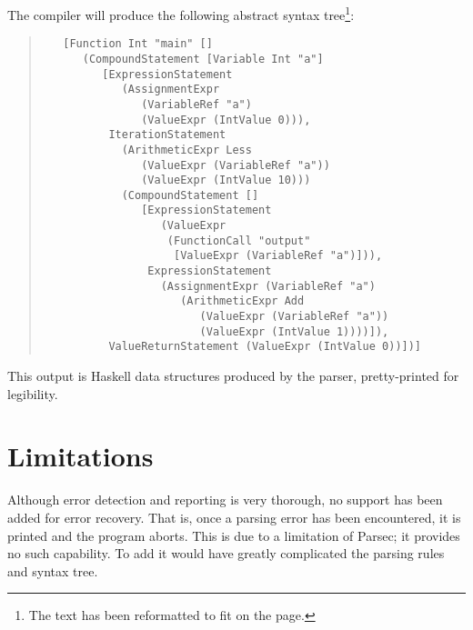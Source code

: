 \documentclass[12pt]{amsart}
\begin{document}
The compiler will produce the following abstract syntax
tree\footnote{The text has been reformatted to fit on the page.}:

\begin{verse}
\begin{verbatim}
   [Function Int "main" []
      (CompoundStatement [Variable Int "a"]
         [ExpressionStatement
            (AssignmentExpr
               (VariableRef "a")
               (ValueExpr (IntValue 0))),
          IterationStatement
            (ArithmeticExpr Less
               (ValueExpr (VariableRef "a"))
               (ValueExpr (IntValue 10)))
            (CompoundStatement []
               [ExpressionStatement
                  (ValueExpr
                   (FunctionCall "output"
                    [ValueExpr (VariableRef "a")])),
                ExpressionStatement
                  (AssignmentExpr (VariableRef "a")
                     (ArithmeticExpr Add
                        (ValueExpr (VariableRef "a"))
                        (ValueExpr (IntValue 1))))]),
          ValueReturnStatement (ValueExpr (IntValue 0))])]
\end{verbatim}
\end{verse}

This output is Haskell data structures produced by
the parser, pretty-printed for legibility.

\section{Limitations}
Although error detection and reporting is very thorough, no support
has been added for error recovery. That is, once a parsing error has
been encountered, it is printed and the program aborts. This is due to
a limitation of Parsec; it provides no such capability. To add it
would have greatly complicated the parsing rules and syntax tree.
\end{document}
